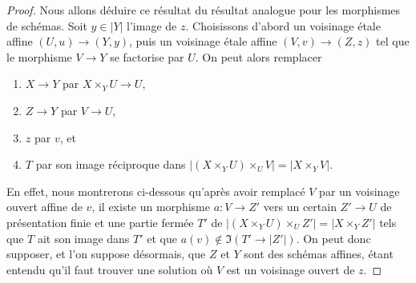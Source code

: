 \begin{proof}
Nous allons déduire ce résultat du résultat analogue pour les morphismes de schémas.
Soit $y \in |Y|$ l'image de $z$. Choisissons d'abord un voisinage \'etale affine
$(U, u) \to (Y, y)$, puis un voisinage \'etale affine
$(V, v) \to (Z, z)$ tel que le morphisme $V \to Y$
se factorise par $U$. On peut alors remplacer
\begin{enumerate}
\item $X \to Y$ par $X \times_Y U \to U$,
\item $Z \to Y$ par $V \to U$,
\item $z$ par $v$, et
\item $T$ par son image réciproque dans
$|(X \times_Y U) \times_U V| = |X \times_Y V|$.
\end{enumerate}
En effet, nous montrerons ci-dessous qu'après avoir remplacé $V$ par un voisinage
ouvert affine de $v$, il existe un morphisme $a : V \to Z'$ vers
un certain $Z' \to U$ de présentation finie et une partie fermée $T'$
de $|(X \times_Y U) \times_U Z'| = |X \times_Y Z'|$ tels que
$T$ ait son image dans $T'$ et que $a(v) \not \in \Im(T' \to |Z'|)$.
On peut donc supposer, et l'on suppose désormais, que $Z$ et $Y$ sont des schémas affines,
étant entendu qu'il faut trouver une solution où $V$
est un voisinage ouvert de $z$.


\end{proof}
